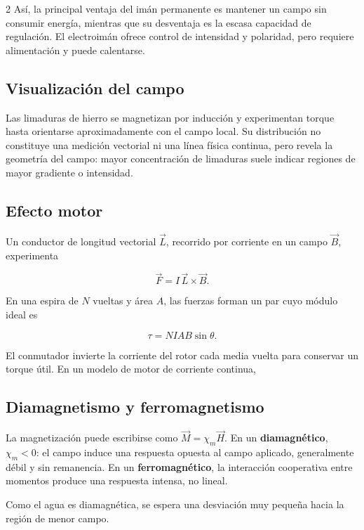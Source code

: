 \documentclass[10pt,letterpaper]{article}
\begin{document}
\begin{multicols}{2}
Así, la principal ventaja del imán permanente es mantener un campo sin consumir energía, mientras que su desventaja es la escasa capacidad de regulación. El electroimán ofrece control de intensidad y polaridad, pero requiere alimentación y puede calentarse.

\subsection{Visualización del campo}

Las limaduras de hierro se magnetizan por inducción y experimentan torque hasta orientarse aproximadamente con el campo local. Su distribución no constituye una medición vectorial ni una línea física continua, pero revela la geometría del campo: mayor concentración de limaduras suele indicar regiones de mayor gradiente o intensidad.

\subsection{Efecto motor}

Un conductor de longitud vectorial $\vec L$, recorrido por corriente en un campo $\vec B$, experimenta

\begin{equation}
  \vec F=I\,\vec L\times\vec B.
  \label{eq:fuerza}
\end{equation}

En una espira de $N$ vueltas y área $A$, las fuerzas forman un par cuyo módulo ideal es

\begin{equation}
  \tau=NIAB\sin\theta.
  \label{eq:torque}
\end{equation}

El conmutador invierte la corriente del rotor cada media vuelta para conservar un torque útil. En un modelo de motor de corriente continua,

\subsection{Diamagnetismo y ferromagnetismo}

La magnetización puede escribirse como $\vec M=\chi_m\vec H$. En un \textbf{diamagnético}, $\chi_m<0$: el campo induce una respuesta opuesta al campo aplicado, generalmente débil y sin remanencia. En un \textbf{ferromagnético}, la interacción cooperativa entre momentos produce una respuesta intensa, no lineal.

Como el agua es diamagnética, se espera una desviación muy pequeña hacia la región de menor campo. 

\end{multicols}
\end{document}

